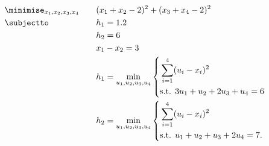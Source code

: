 \begin{align*}
  &\minimise_{x_1, x_2, x_3, x_4} \quad
  && (x_1 + x_2 - 2)^2 + (x_3 + x_4 - 2)^2 \\
  &\subjectto
  && h_1 = 1.2 \\
  &&& h_2 = 6 \\
  &&& x_1 - x_2 = 3 \\
  &&& h_1 = \min_{u_1, u_2, u_3, u_4}
  \left\{
  \begin{aligned}
  &\sum_{i=1}^4(u_i - x_i)^2  \\
  &\textrm{s.t. } 3u_1 + u_2 + 2u_3 + u_4 = 6
  \end{aligned}
  \right.\\
  &&& h_2 = \min_{u_1, u_2, u_3, u_4}
  \left\{
  \begin{aligned}
  &\sum_{i=1}^4(u_i - x_i)^2  \\
  &\textrm{s.t. } u_1 + u_2 + u_3 + 2u_4 = 7.
  \end{aligned}
  \right.
  \end{align*}